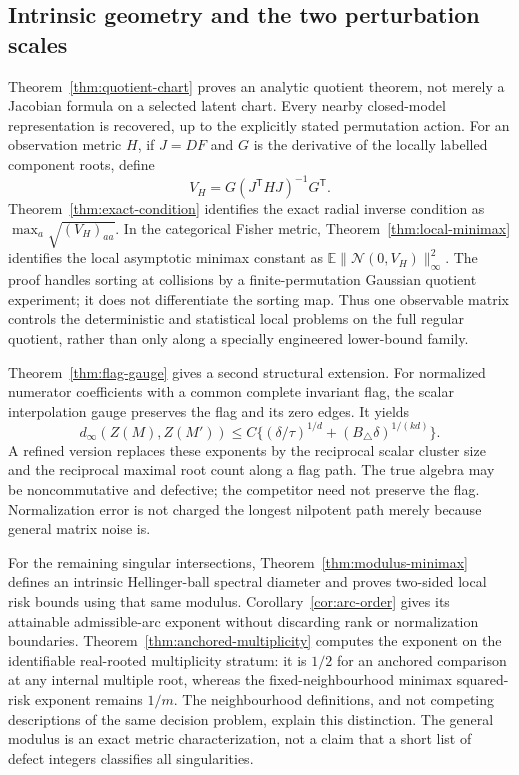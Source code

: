 \documentclass[11pt,reqno]{amsart}
\numberwithin{equation}{section}
\theoremstyle{definition}\newtheorem{definition}[theorem]{Definition}
\theoremstyle{remark}\newtheorem{remark}[theorem]{Remark}
\newcommand{\E}{\mathbb E}
\begin{document}
\subsection{Intrinsic geometry and the two perturbation scales}
Theorem~\ref{thm:quotient-chart} proves an analytic quotient theorem,
not merely a Jacobian formula on a selected latent chart. Every nearby
closed-model representation is recovered, up to the explicitly stated
permutation action. For an observation metric $H$, if $J=DF$ and $G$
is the derivative of the locally labelled component roots, define
\[
 V_H=G(J^{\mathsf T}HJ)^{-1}G^{\mathsf T}.
\]
Theorem~\ref{thm:exact-condition} identifies the exact radial inverse
condition as $\max_a\sqrt{(V_H)_{aa}}$. In the categorical Fisher metric,
Theorem~\ref{thm:local-minimax} identifies the local asymptotic minimax
constant as $\E\|\mathcal N(0,V_H)\|_\infty^2$. The proof handles
sorting at collisions by a finite-permutation Gaussian quotient
experiment; it does not differentiate the sorting map. Thus one
observable matrix controls the deterministic and statistical local
problems on the full regular quotient, rather than only along a
specially engineered lower-bound family.

Theorem~\ref{thm:flag-gauge} gives a second structural extension. For
normalized numerator coefficients with a common complete invariant
flag, the scalar interpolation gauge preserves the flag and its zero
edges. It yields
\[
 d_\infty(Z(M),Z(M'))\le C\{(\delta/\tau)^{1/d}
                         +(B_\triangle\delta)^{1/(kd)}\}.
\]
A refined version replaces these exponents by the reciprocal scalar
cluster size and the reciprocal maximal root count along a flag path.
The true algebra may be noncommutative and defective; the competitor
need not preserve the flag. Normalization error is not charged the
longest nilpotent path merely because general matrix noise is.

For the remaining singular intersections,
Theorem~\ref{thm:modulus-minimax} defines an intrinsic Hellinger-ball
spectral diameter and proves two-sided local risk bounds using that
same modulus. Corollary~\ref{cor:arc-order} gives its attainable
admissible-arc exponent without discarding rank or normalization
boundaries. Theorem~\ref{thm:anchored-multiplicity} computes the
exponent on the identifiable real-rooted multiplicity stratum: it is
$1/2$ for an anchored comparison at any internal multiple root, whereas
the fixed-neighbourhood minimax squared-risk exponent remains $1/m$.
The neighbourhood definitions, and not competing descriptions of the
same decision problem, explain this distinction. The general modulus
is an exact metric characterization, not a claim that a short list of
defect integers classifies all singularities.
\end{document}
